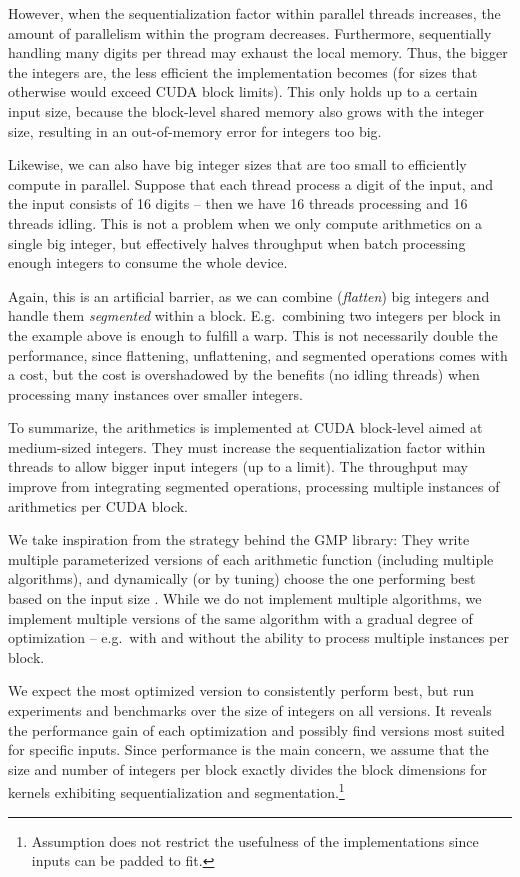 However, when the sequentialization factor within parallel threads increases,
the amount of parallelism within the program decreases. Furthermore,
sequentially handling many digits per thread may exhaust the local memory. Thus,
the bigger the integers are, the less efficient the implementation becomes (for
sizes that otherwise would exceed CUDA block limits). This only holds up to a
certain input size, because the block-level shared memory also grows with the
integer size, resulting in an out-of-memory error for integers too big.

Likewise, we can also have big integer sizes that are too small to efficiently
compute in parallel. Suppose that each thread process a digit of the input, and
the input consists of 16 digits -- then we have 16 threads processing and 16
threads idling. This is not a problem when we only compute arithmetics on a
single big integer, but effectively halves throughput when batch processing
enough integers to consume the whole device.

Again, this is an artificial barrier, as we can combine (\textit{flatten}) big
integers and handle them \textit{segmented} within a block. E.g.\ combining two
integers per block in the example above is enough to fulfill a warp. This is not
necessarily double the performance, since flattening, unflattening, and
segmented operations comes with a cost, but the cost is overshadowed by the
benefits (no idling threads) when processing many instances over smaller
integers. \bigskip

To summarize, the arithmetics is implemented at CUDA block-level aimed at
medium-sized integers. They must increase the sequentialization factor within
threads to allow bigger input integers (up to a limit). The throughput may
improve from integrating segmented operations, processing multiple instances of
arithmetics per CUDA block.

We take inspiration from the strategy behind the GMP library: They write
multiple parameterized versions of each arithmetic function (including multiple
algorithms), and dynamically (or by tuning) choose the one performing best based
on the input size \cite{GMP}. While we do not implement multiple algorithms, we
implement multiple versions of the same algorithm with a gradual degree of
optimization -- e.g.\ with and without the ability to process multiple instances
per block.

We expect the most optimized version to consistently perform best, but run
experiments and benchmarks over the size of integers on all versions. It reveals
the performance gain of each optimization and possibly find versions most suited
for specific inputs. Since performance is the main concern, we assume that the
size and number of integers per block exactly divides the block dimensions for
kernels exhibiting sequentialization and segmentation.\footnote{Assumption does
  not restrict the usefulness of the implementations since inputs can be padded
  to fit.}


